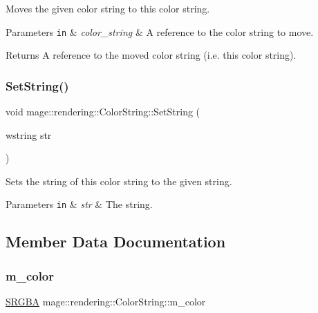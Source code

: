 Moves the given color string to this color string.


\begin{DoxyParams}[1]{Parameters}
\mbox{\tt in}  & {\em color\+\_\+string} & A reference to the color string to move. \\
\hline
\end{DoxyParams}
\begin{DoxyReturn}{Returns}
A reference to the moved color string (i.\+e. this color string). 
\end{DoxyReturn}
\hypertarget{classmage_1_1rendering_1_1_color_string_aefee43f68f87617976f89430bac71fba}{}\label{classmage_1_1rendering_1_1_color_string_aefee43f68f87617976f89430bac71fba} 
\subsubsection{\texorpdfstring{Set\+String()}{SetString()}}
{\footnotesize\ttfamily void mage\+::rendering\+::\+Color\+String\+::\+Set\+String (\begin{DoxyParamCaption}\item[{wstring}]{str }\end{DoxyParamCaption})\hspace{0.3cm}{\ttfamily [noexcept]}}

Sets the string of this color string to the given string.


\begin{DoxyParams}[1]{Parameters}
\mbox{\tt in}  & {\em str} & The string. \\
\hline
\end{DoxyParams}


\subsection{Member Data Documentation}
\hypertarget{classmage_1_1rendering_1_1_color_string_a5b601126d5067469b05a0e33450b950c}{}\label{classmage_1_1rendering_1_1_color_string_a5b601126d5067469b05a0e33450b950c} 
\subsubsection{\texorpdfstring{m\+\_\+color}{m\_color}}
{\footnotesize\ttfamily \hyperlink{structmage_1_1_s_r_g_b_a}{S\+R\+G\+BA} mage\+::rendering\+::\+Color\+String\+::m\+\_\+color\hspace{0.3cm}{\ttfamily [private]}}

